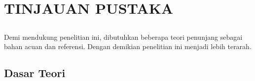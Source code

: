 \chapter{TINJAUAN PUSTAKA}
\vspace{1ex}

\section*{}
Demi mendukung penelitian ini, dibutuhkan beberapa teori penunjang sebagai bahan acuan dan referensi. Dengan demikian penelitian ini menjadi lebih terarah. 
\vspace{1ex}

\section{Dasar Teori}
\vspace{1ex}

